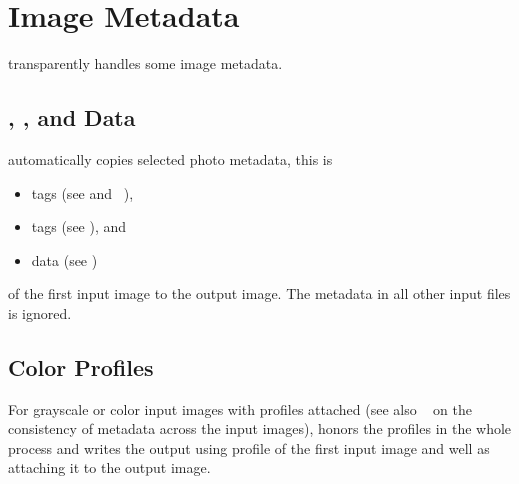 

\section{\label{sec:metadata}%
  Image Metadata}

\App{} transparently handles some image metadata.


\subsection{\label{sec:metadata-exif-iptc-xmp}%
  , , and  Data}

\App{} automatically copies selected photo metadata, this is

\begin{itemize}
\item
   tags (see 
  and \appendixName~),

\item
   tags (see ), and

\item
   data (see )
\end{itemize}

\noindent of the first input image to the output image.  The metadata
in all other input files is ignored.


\subsection{\label{sec:metadata-icc}%
   Color Profiles}

For grayscale or color input images with  profiles
attached (see also \sectionName~ on
the consistency of  metadata across the input images),
\App{} honors the profiles in the whole \appisdoing{} process and
writes the output using  profile of the first input image
and well as attaching it to the output image.

